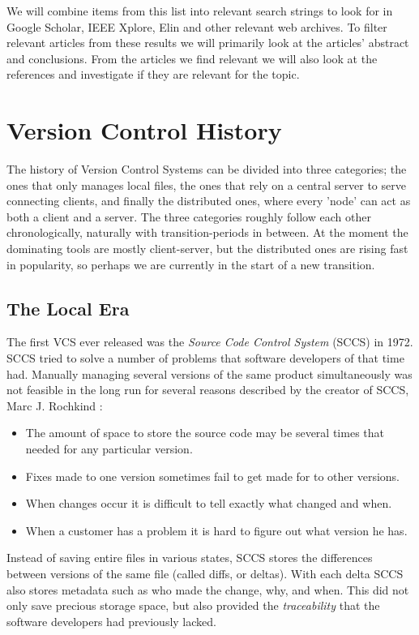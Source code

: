 \documentclass{article}
\begin{document}
We will combine items from this list into relevant search strings to
look for in Google Scholar, IEEE Xplore, Elin and other relevant web
archives.  To filter relevant articles from these results we will
primarily look at the articles' abstract and conclusions. From the
articles we find relevant we will also look at the references and
investigate if they are relevant for the topic.

\section{Version Control History}
The history of Version Control Systems can be divided into three
categories; the ones that only manages local files, the ones that rely
on a central server to serve connecting clients, and finally the
distributed ones, where every 'node' can act as both a client and a
server. The three categories roughly follow each other
chronologically, naturally with transition-periods in between. At the
moment the dominating tools are mostly client-server, but the
distributed ones are rising fast in popularity, so perhaps we are
currently in the start of a new transition.

\subsection{The Local Era}
The first VCS ever released was the \emph{Source Code Control System}
(SCCS) in 1972. SCCS tried to solve a number of problems that software
developers of that time had. Manually managing several versions of the
same product simultaneously was not feasible in the long run for
several reasons described by the creator of SCCS, Marc J. Rochkind
\cite{sccs}:

\begin{itemize}
\item The amount of space to store the source code may be several
      times that needed for any particular version.
\item Fixes made to one version sometimes fail to get made for to
      other versions.
\item When changes occur it is difficult to tell exactly what changed
      and when.
\item When a customer has a problem it is hard to figure out what
      version he has.
\end{itemize}

Instead of saving entire files in various states, SCCS stores the
differences between versions of the same file (called diffs, or
deltas). With each delta SCCS also stores metadata such as who made
the change, why, and when. This did not only save precious storage
space, but also provided the \emph{traceability} that the software
developers had previously lacked.
\end{document}
